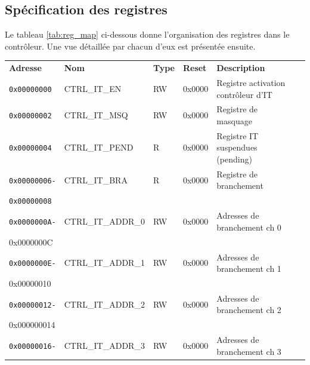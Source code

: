 \subsection{Spécification des registres}
Le tableau \ref{tab:reg_map} ci-dessous donne l'organisation des registres dans le contrôleur.
Une vue détaillée par chacun d'eux est présentée ensuite.
\newpage
\begin{table}[H]
	\centering
	\begin{tabular}{llllll}
		\hline
		\addlinespace[1ex] %
		\textbf{Adresse}     & \textbf{Nom}           & \textbf{Type} & \textbf{Reset} & \textbf{Description}                 \\
		\rhline
		\texttt{0x00000000}  & CTRL\_IT\_EN           & RW            & 0x0000         & Registre activation contrôleur d'IT \\
		\rhline
		\texttt{0x00000002}  & CTRL\_IT\_MSQ          & RW            & 0x0000         & Registre de masquage                 \\
		\rhline
		\texttt{0x00000004}  & CTRL\_IT\_PEND         & R             & 0x0000         & Registre IT suspendues (pending)     \\
		\rhline
		\texttt{0x00000006-} & CTRL\_IT\_BRA          & R             & 0x0000         & Registre de branchement              \\
		\texttt{0x00000008}  &                        &               &                &                                      \\
		\rhline
		\texttt{0x0000000A-} & CTRL\_IT\_ADDR\_0      & RW            & 0x0000         & Adresses de branchement ch 0         \\
		{0x0000000C}         &                        &               &                &                                      \\
		\rhline
		\texttt{0x0000000E-} & CTRL\_IT\_ADDR\_1      & RW            & 0x0000         & Adresses de branchement ch 1         \\
		{0x00000010}         &                        &               &                &                                      \\
		\rhline
		\texttt{0x00000012-} & CTRL\_IT\_ADDR\_2      & RW            & 0x0000         & Adresses de branchement ch 2         \\
		{0x000000014}        &                        &               &                &                                      \\
		\rhline
		\texttt{0x00000016-} & CTRL\_IT\_ADDR\_3      & RW            & 0x0000         & Adresses de branchement ch 3         \\

\end{tabular}
\end{table}
